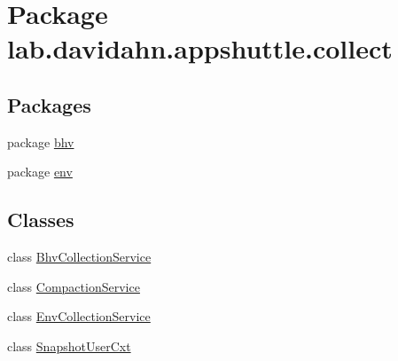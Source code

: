 \hypertarget{namespacelab_1_1davidahn_1_1appshuttle_1_1collect}{\section{\-Package lab.\-davidahn.\-appshuttle.\-collect}
\label{namespacelab_1_1davidahn_1_1appshuttle_1_1collect}
}
\subsection*{\-Packages}
\begin{DoxyCompactItemize}
\item 
package \hyperlink{namespacelab_1_1davidahn_1_1appshuttle_1_1collect_1_1bhv}{bhv}
\item 
package \hyperlink{namespacelab_1_1davidahn_1_1appshuttle_1_1collect_1_1env}{env}
\end{DoxyCompactItemize}
\subsection*{\-Classes}
\begin{DoxyCompactItemize}
\item 
class \hyperlink{classlab_1_1davidahn_1_1appshuttle_1_1collect_1_1_bhv_collection_service}{\-Bhv\-Collection\-Service}
\item 
class \hyperlink{classlab_1_1davidahn_1_1appshuttle_1_1collect_1_1_compaction_service}{\-Compaction\-Service}
\item 
class \hyperlink{classlab_1_1davidahn_1_1appshuttle_1_1collect_1_1_env_collection_service}{\-Env\-Collection\-Service}
\item 
class \hyperlink{classlab_1_1davidahn_1_1appshuttle_1_1collect_1_1_snapshot_user_cxt}{\-Snapshot\-User\-Cxt}
\end{DoxyCompactItemize}
